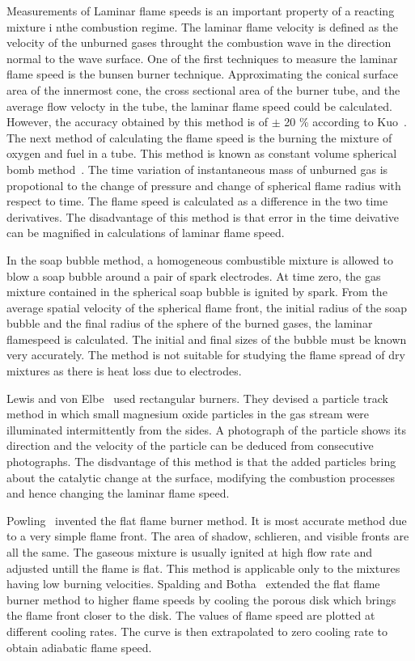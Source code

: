 Measurements of Laminar flame speeds is an important property of a
reacting mixture i nthe combustion regime. The laminar flame velocity is defined as the
velocity of the unburned gases throught the combustion wave in the
direction normal to the wave surface. One of the first techniques to measure the laminar flame
speed is the bunsen burner technique. Approximating the conical
surface area of the innermost cone, the cross sectional area of the
burner tube, and the average flow velocty in the tube, the laminar flame
speed could be calculated. However, the accuracy obtained by this
method is of $\pm $ 20 \% according to Kuo~\cite{Kuo}. The next method
of calculating the flame speed is the burning the mixture of oxygen
and fuel in a tube. This method is known as constant volume spherical
bomb method~\cite{Kuo}. The time variation of instantaneous mass of
unburned gas is propotional to the change of pressure and change of
spherical flame radius with respect to time. The flame speed is
calculated as a difference in the two time derivatives. The
disadvantage of this method is that error in the time deivative can be
magnified in calculations of laminar flame speed.

 In the soap bubble method, a homogeneous combustible mixture is
allowed to blow a soap bubble around a pair of spark electrodes. At
time zero, the gas mixture contained in the spherical soap bubble is
ignited by spark. From the average spatial velocity of the spherical
flame front, the initial radius of the soap bubble and the final
radius of the sphere of the burned gases, the laminar flamespeed is
calculated. The initial and final sizes of the bubble must be known
very accurately. The method is not suitable for studying the flame
spread of dry mixtures as there is heat loss due to electrodes.

 Lewis and von Elbe~\cite{lewis} used rectangular
burners. They devised a particle track method in which small magnesium
oxide particles in the gas stream were illuminated intermittently from the
sides. A photograph of the particle shows its direction and the
velocity of the particle can be deduced from consecutive
photographs. The disdvantage of this method is that the added
particles bring about the catalytic change at the surface, modifying the combustion
processes and hence changing the laminar flame speed.

 Powling~\cite{powling} invented the flat flame burner
method. It is most accurate method due to a very simple flame
front. The area of shadow, schlieren, and visible fronts are all the
same. The gaseous mixture is usually ignited at high flow rate and
adjusted untill the flame is flat. This method is applicable only to
the mixtures having low burning velocities. Spalding and
Botha~\cite{spalding} extended the flat flame burner method to higher flame
speeds by cooling the porous disk which brings the flame front closer to
the disk. The values of flame speed are plotted at different cooling
rates. The curve is then extrapolated to zero cooling rate to obtain
adiabatic flame speed.

